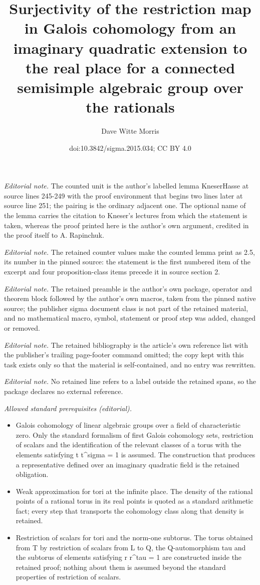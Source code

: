 \documentclass[10pt,a4paper]{amsart}
\title{Surjectivity of the restriction map in Galois cohomology from an imaginary quadratic extension to the real place for a connected semisimple algebraic group over the rationals}
\author{Dave Witte Morris}
\date{doi:10.3842/sigma.2015.034; CC BY 4.0}
\numberwithin{equation}{section}
\begin{document}
\maketitle
\setcounter{section}{2}
\setcounter{prop}{4}
\noindent\textit{Editorial note.} The counted unit is the author's labelled lemma KneserHasse at source lines 245-249 with the proof environment that begins two lines later at source line 251; the pairing is the ordinary adjacent one. The optional name of the lemma carries the citation to Kneser's lectures from which the statement is taken, whereas the proof printed here is the author's own argument, credited in the proof itself to A. Rapinchuk.\par\medskip
\noindent\textit{Editorial note.} The retained counter values make the counted lemma print as 2.5, its number in the pinned source: the statement is the first numbered item of the excerpt and four proposition-class items precede it in source section 2.\par\medskip
\noindent\textit{Editorial note.} The retained preamble is the author's own package, operator and theorem block followed by the author's own macros, taken from the pinned native source; the publisher sigma document class is not part of the retained material, and no mathematical macro, symbol, statement or proof step was added, changed or removed.\par\medskip
\noindent\textit{Editorial note.} The retained bibliography is the article's own reference list with the publisher's trailing page-footer command omitted; the copy kept with this task exists only so that the material is self-contained, and no entry was rewritten.\par\medskip
\noindent\textit{Editorial note.} No retained line refers to a label outside the retained spans, so the package declares no external reference.\par\medskip
\noindent\textit{Allowed standard prerequisites (editorial).}\begin{itemize}
\item Galois cohomology of linear algebraic groups over a field of characteristic zero. Only the standard formalism of first Galois cohomology sets, restriction of scalars and the identification of the relevant classes of a torus with the elements satisfying t t\textasciicircum{}sigma = 1 is assumed. The construction that produces a representative defined over an imaginary quadratic field is the retained obligation.
\item Weak approximation for tori at the infinite place. The density of the rational points of a rational torus in its real points is quoted as a standard arithmetic fact; every step that transports the cohomology class along that density is retained.
\item Restriction of scalars for tori and the norm-one subtorus. The torus obtained from T by restriction of scalars from L to Q, the Q-automorphism tau and the subtorus of elements satisfying r r\textasciicircum{}tau = 1 are constructed inside the retained proof; nothing about them is assumed beyond the standard properties of restriction of scalars.
\end{itemize}\medskip
\end{document}
